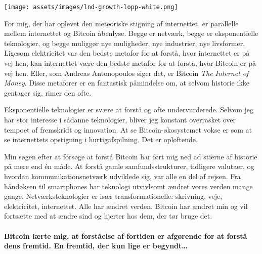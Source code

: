 \begin{center}
  \texttt{[image: assets/images/lnd-growth-lopp-white.png]}
  \label{fig:lnd-growth-lopp-white.png}
\end{center}

For mig, der har oplevet den meteoriske stigning af internettet, er parallelle
mellem internettet og Bitcoin åbenlyse. Begge er netværk, begge
er eksponentielle teknologier, og begge muliggør nye muligheder, nye
industrier, nye livsformer. Ligesom elektricitet var den bedste
metafor for at forstå, hvor internettet er på vej hen, kan internettet
være den bedste metafor for at forstå, hvor Bitcoin er på vej hen. Eller, som
Andreas Antonopoulos siger det, er Bitcoin \textit{The Internet of Money}.
Disse metaforer er en fantastisk påmindelse om, at selvom historie ikke gentager
sig, rimer den ofte.

Eksponentielle teknologier er svære at forstå og ofte undervurderede.
Selvom jeg har stor interesse i sådanne teknologier, bliver jeg
konstant overrasket over tempoet af fremskridt og innovation. At se
Bitcoin-økosystemet vokse er som at se internettets opstigning i
hurtigafspilning. Det er opløftende.

Min søgen efter at forsøge at forstå Bitcoin har ført mig ned ad stierne
af historie på mere end én måde. At forstå gamle samfundsstrukturer, 
tidligere valutaer, og hvordan kommunikationsnetværk udviklede sig, var alle
en del af rejsen. Fra håndøksen til smartphones har teknologi
utvivlsomt ændret vores verden mange gange. Netværksteknologier
er især transformationelle: skrivning, veje, elektricitet, internettet.
Alle har ændret verden. Bitcoin har ændret min og
vil fortsætte med at ændre sind og hjerter hos dem, der tør bruge
det.

\paragraph{Bitcoin lærte mig, at forståelse af fortiden er afgørende for
at forstå dens fremtid. En fremtid, der kun lige er begyndt\ldots}

